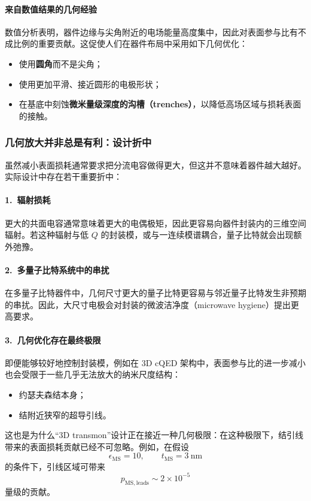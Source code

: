 \documentclass[12pt,a4paper,oneside]{ctexbook}
\begin{document}
\paragraph{来自数值结果的几何经验}
数值分析表明，器件边缘与尖角附近的电场能量高度集中，因此对表面参与比有不成比例的重要贡献。这促使人们在器件布局中采用如下几何优化：
\begin{itemize}
    \item 使用\textbf{圆角}而不是尖角；
    \item 使用更加平滑、接近圆形的电极形状；
    \item 在基底中刻蚀\textbf{微米量级深度的沟槽（trenches）}，以降低高场区域与损耗表面的接触。
\end{itemize}

\subsubsection{几何放大并非总是有利：设计折中}

虽然减小表面损耗通常要求把分流电容做得更大，但这并不意味着器件越大越好。实际设计中存在若干重要折中：

\paragraph{1.\ 辐射损耗}
更大的共面电容通常意味着更大的电偶极矩，因此更容易向器件封装内的三维空间辐射。若这种辐射与低 \(Q\) 的封装模，或与一连续模谱耦合，量子比特就会出现额外弛豫。

\paragraph{2.\ 多量子比特系统中的串扰}
在多量子比特器件中，几何尺寸更大的量子比特更容易与邻近量子比特发生非预期的串扰。因此，大尺寸电极会对封装的微波洁净度（microwave hygiene）提出更高要求。

\paragraph{3.\ 几何优化存在最终极限}
即便能够较好地控制封装模，例如在 3D cQED 架构中，表面参与比的进一步减小也会受限于一些几乎无法放大的纳米尺度结构：
\begin{itemize}
    \item 约瑟夫森结本身；
    \item 结附近狭窄的超导引线。
\end{itemize}

这也是为什么“3D transmon”设计正在接近一种几何极限：在这种极限下，结引线带来的表面损耗贡献已经不可忽略。例如，在假设
\[
\epsilon_{\mathrm{MS}}=10,\qquad t_{\mathrm{MS}}=3~\mathrm{nm}
\]
的条件下，引线区域可带来
\[
p_{\mathrm{MS,leads}}\sim 2\times 10^{-5}
\]
量级的贡献。
\end{document}
